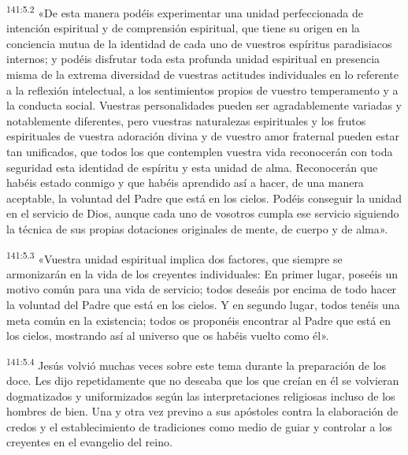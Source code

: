 \par
\textsuperscript{141:5.2} «De esta manera podéis experimentar una unidad perfeccionada de intención espiritual y de comprensión espiritual, que tiene su origen en la conciencia mutua de la identidad de cada uno de vuestros espíritus paradisiacos internos; y podéis disfrutar toda esta profunda unidad espiritual en presencia misma de la extrema diversidad de vuestras actitudes individuales en lo referente a la reflexión intelectual, a los sentimientos propios de vuestro temperamento y a la conducta social. Vuestras personalidades pueden ser agradablemente variadas y notablemente diferentes, pero vuestras naturalezas espirituales y los frutos espirituales de vuestra adoración divina y de vuestro amor fraternal pueden estar tan unificados, que todos los que contemplen vuestra vida reconocerán con toda seguridad esta identidad de espíritu y esta unidad de alma. Reconocerán que habéis estado conmigo y que habéis aprendido así a hacer, de una manera aceptable, la voluntad del Padre que está en los cielos. Podéis conseguir la unidad en el servicio de Dios, aunque cada uno de vosotros cumpla ese servicio siguiendo la técnica de sus propias dotaciones originales de mente, de cuerpo y de alma».

\par
\textsuperscript{141:5.3} «Vuestra unidad espiritual implica dos factores, que siempre se armonizarán en la vida de los creyentes individuales: En primer lugar, poseéis un motivo común para una vida de servicio; todos deseáis por encima de todo hacer la voluntad del Padre que está en los cielos. Y en segundo lugar, todos tenéis una meta común en la existencia; todos os proponéis encontrar al Padre que está en los cielos, mostrando así al universo que os habéis vuelto como él».

\par
\textsuperscript{141:5.4} Jesús volvió muchas veces sobre este tema durante la preparación de los doce. Les dijo repetidamente que no deseaba que los que creían en él se volvieran dogmatizados y uniformizados según las interpretaciones religiosas incluso de los hombres de bien. Una y otra vez previno a sus apóstoles contra la elaboración de credos y el establecimiento de tradiciones como medio de guiar y controlar a los creyentes en el evangelio del reino.

